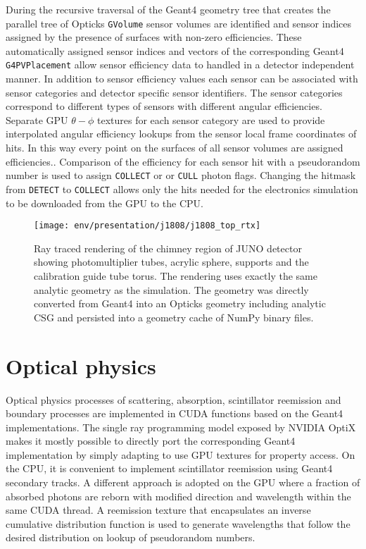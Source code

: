 \documentclass{webofc}
\begin{document}
During the recursive traversal of the Geant4 geometry tree that creates the parallel tree of Opticks {\tt GVolume}
sensor volumes are identified and sensor indices assigned by the presence of surfaces with non-zero efficiencies. 
These automatically assigned sensor indices and vectors of the corresponding Geant4 {\tt G4PVPlacement} 
allow sensor efficiency data to handled in a detector independent manner. In addition to sensor efficiency values 
each sensor can be associated with sensor categories and detector specific sensor identifiers. The sensor categories
correspond to different types of sensors with different angular efficiencies.  Separate GPU $\theta-\phi$ textures 
for each sensor category are used to provide interpolated angular efficiency lookups from the sensor local 
frame coordinates of hits. In this way every point on the surfaces of all sensor volumes are assigned efficiencies.. 
Comparison of the efficiency for each sensor hit with a pseudorandom number is used to assign {\tt COLLECT} or 
or {\tt CULL} photon flags. Changing the hitmask from {\tt DETECT} to {\tt COLLECT} allows only the hits 
needed for the electronics simulation to be downloaded from the GPU to the CPU.  
  

        
%
%
\begin{figure}
\centering
\texttt{[image: env/presentation/j1808/j1808\_top\_rtx]}
\caption{Ray traced rendering of the chimney region of JUNO detector showing photomultiplier tubes, acrylic sphere, supports and the calibration guide tube torus. 
The rendering uses exactly the same analytic geometry as the simulation.
The geometry was directly converted from Geant4 into an Opticks geometry including analytic CSG 
and persisted into a geometry cache of NumPy\cite{numpy} binary files. 
}
\label{j1808} 
\end{figure}
%
%
\section{Optical physics}%
%
Optical physics processes of scattering, absorption, scintillator reemission and 
boundary processes are implemented in CUDA functions based on the Geant4
implementations. 
%
The single ray programming model exposed by NVIDIA OptiX makes it mostly possible 
to directly port the corresponding Geant4 implementation by simply 
adapting to use GPU textures for property access. 
%
On the CPU, it is convenient to implement scintillator reemission using Geant4 secondary 
tracks. A different approach is adopted on the GPU where a fraction of absorbed photons
are reborn with modified direction and wavelength within the same CUDA thread. 
A reemission texture that encapsulates an inverse cumulative distribution function 
is used to generate wavelengths that follow the desired distribution on lookup of pseudorandom numbers. 
%
%
\end{document}

